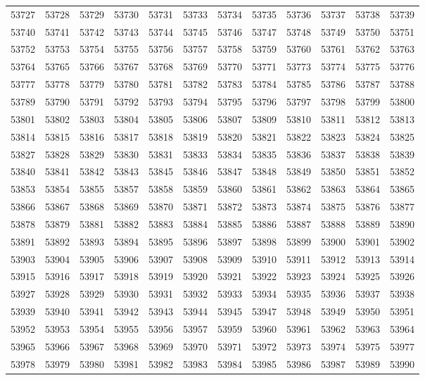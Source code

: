 \begin{center}
\begin{longtable}{llllllllllll}
53727 &53728 &53729 &53730 &53731 &53733 &53734 &53735 &53736 &53737 &53738 &53739 \\
53740 &53741 &53742 &53743 &53744 &53745 &53746 &53747 &53748 &53749 &53750 &53751 \\
53752 &53753 &53754 &53755 &53756 &53757 &53758 &53759 &53760 &53761 &53762 &53763 \\
53764 &53765 &53766 &53767 &53768 &53769 &53770 &53771 &53773 &53774 &53775 &53776 \\
53777 &53778 &53779 &53780 &53781 &53782 &53783 &53784 &53785 &53786 &53787 &53788 \\
53789 &53790 &53791 &53792 &53793 &53794 &53795 &53796 &53797 &53798 &53799 &53800 \\
53801 &53802 &53803 &53804 &53805 &53806 &53807 &53809 &53810 &53811 &53812 &53813 \\
53814 &53815 &53816 &53817 &53818 &53819 &53820 &53821 &53822 &53823 &53824 &53825 \\
53827 &53828 &53829 &53830 &53831 &53833 &53834 &53835 &53836 &53837 &53838 &53839 \\
53840 &53841 &53842 &53843 &53845 &53846 &53847 &53848 &53849 &53850 &53851 &53852 \\
53853 &53854 &53855 &53857 &53858 &53859 &53860 &53861 &53862 &53863 &53864 &53865 \\
53866 &53867 &53868 &53869 &53870 &53871 &53872 &53873 &53874 &53875 &53876 &53877 \\
53878 &53879 &53881 &53882 &53883 &53884 &53885 &53886 &53887 &53888 &53889 &53890 \\
53891 &53892 &53893 &53894 &53895 &53896 &53897 &53898 &53899 &53900 &53901 &53902 \\
53903 &53904 &53905 &53906 &53907 &53908 &53909 &53910 &53911 &53912 &53913 &53914 \\
53915 &53916 &53917 &53918 &53919 &53920 &53921 &53922 &53923 &53924 &53925 &53926 \\
53927 &53928 &53929 &53930 &53931 &53932 &53933 &53934 &53935 &53936 &53937 &53938 \\
53939 &53940 &53941 &53942 &53943 &53944 &53945 &53947 &53948 &53949 &53950 &53951 \\
53952 &53953 &53954 &53955 &53956 &53957 &53959 &53960 &53961 &53962 &53963 &53964 \\
53965 &53966 &53967 &53968 &53969 &53970 &53971 &53972 &53973 &53974 &53975 &53977 \\
53978 &53979 &53980 &53981 &53982 &53983 &53984 &53985 &53986 &53987 &53989 &53990 \\

\end{longtable}
\end{center}
